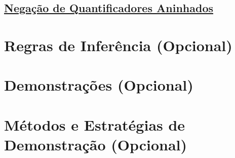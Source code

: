 \subsection*{\underline{Negação de Quantificadores Aninhados}}

\section{Regras de Inferência (Opcional)}
\section{Demonstrações (Opcional)}
\section{Métodos e Estratégias de Demonstração (Opcional)}